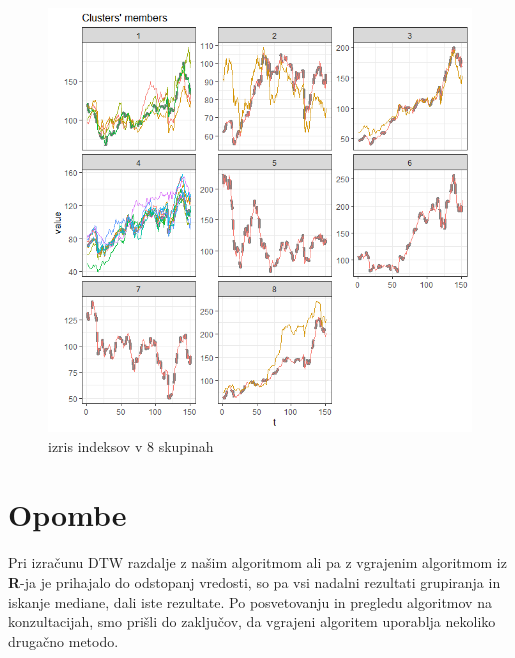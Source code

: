 \documentclass[12pt,a4paper]{article}
\begin{document}
\begin{figure}[h!]
    \centering
    \includegraphics[scale=0.60]{slike/8_skupin.png}
    \caption{izris indeksov v 8 skupinah}
\end{figure}
\pagebreak
\section{Opombe}
Pri izračunu DTW razdalje z našim algoritmom ali pa z vgrajenim algoritmom iz \textbf{R}-ja je prihajalo do 
odstopanj vredosti, so pa vsi nadalni rezultati grupiranja in iskanje mediane, dali iste rezultate.
Po posvetovanju in pregledu algoritmov na konzultacijah, smo prišli do zaključov, da vgrajeni algoritem uporablja
nekoliko drugačno metodo.

\pagebreak
\end{document}
